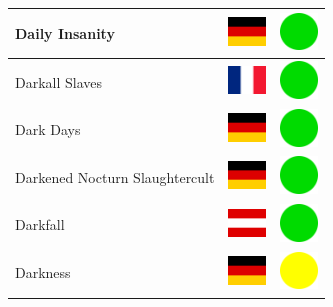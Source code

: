 \documentclass[12pt, a4paper, twoside]{report}
\begin{document}
\begin{center}
\begin{longtable}{|p{5cm}|p{2cm}|p{2cm}|}
 Daily Insanity                                             & \includegraphics[width=1cm]{../img/flags/de} &   \includegraphics[width=1cm]{../likes/y} \\ \hline
 Darkall Slaves                                             & \includegraphics[width=1cm]{../img/flags/fr} &   \includegraphics[width=1cm]{../likes/y} \\ \hline
 Dark Days                                                  & \includegraphics[width=1cm]{../img/flags/de} &   \includegraphics[width=1cm]{../likes/y} \\ \hline
 Darkened Nocturn Slaughtercult                             & \includegraphics[width=1cm]{../img/flags/de} &   \includegraphics[width=1cm]{../likes/y} \\ \hline
 Darkfall                                                   & \includegraphics[width=1cm]{../img/flags/at} &   \includegraphics[width=1cm]{../likes/y} \\ \hline
 Darkness                                                   & \includegraphics[width=1cm]{../img/flags/de} &   \includegraphics[width=1cm]{../likes/m} \\ \hline

\end{longtable}
\end{center}
\end{document}
